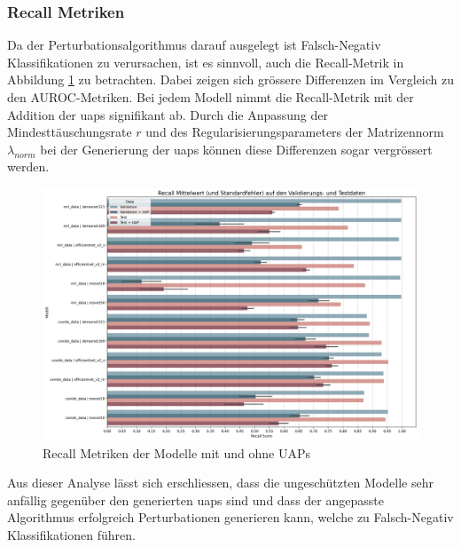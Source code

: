 \subsubsection{Recall Metriken}
Da der Perturbationsalgorithmus darauf ausgelegt ist Falsch-Negativ Klassifikationen zu verursachen, ist es sinnvoll, auch die Recall-Metrik in Abbildung \ref{fig:recall-uap} zu betrachten. Dabei zeigen sich grössere Differenzen im Vergleich zu den AUROC-Metriken. Bei jedem Modell nimmt die Recall-Metrik mit der Addition der \acrshort{uap}s signifikant ab. Durch die Anpassung der Mindesttäuschungsrate $r$ und des Regularisierungsparameters der Matrizennorm $\lambda_{norm}$ bei der Generierung der \acrshort{uap}s können diese Differenzen sogar vergrössert werden.

\begin{figure}[H]
    \centering
    \includegraphics[width=\linewidth]{01-images/05-resultate/RECALLScores_UAP.png}
    \caption{Recall Metriken der Modelle mit und ohne UAPs}
    \label{fig:recall-uap}
\end{figure}

Aus dieser Analyse lässt sich erschliessen, dass die ungeschützten Modelle sehr anfällig gegenüber den generierten \acrshort{uap}s sind und dass der angepasste Algorithmus erfolgreich Perturbationen generieren kann, welche zu Falsch-Negativ Klassifikationen führen.
